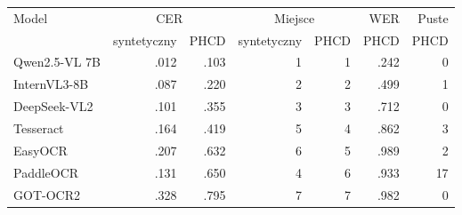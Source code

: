 \begin{tabular}{lrrrrrr}
\toprule
Model & \multicolumn{2}{c}{CER} & \multicolumn{2}{c}{Miejsce} & WER & Puste \\
 & syntetyczny & PHCD & syntetyczny & PHCD & PHCD & PHCD \\
\midrule
Qwen2.5-VL 7B & .012 & .103 & 1 & 1 & .242 & 0 \\
InternVL3-8B & .087 & .220 & 2 & 2 & .499 & 1 \\
DeepSeek-VL2 & .101 & .355 & 3 & 3 & .712 & 0 \\
Tesseract & .164 & .419 & 5 & 4 & .862 & 3 \\
EasyOCR & .207 & .632 & 6 & 5 & .989 & 2 \\
PaddleOCR & .131 & .650 & 4 & 6 & .933 & 17 \\
GOT-OCR2 & .328 & .795 & 7 & 7 & .982 & 0 \\
\bottomrule
\end{tabular}
